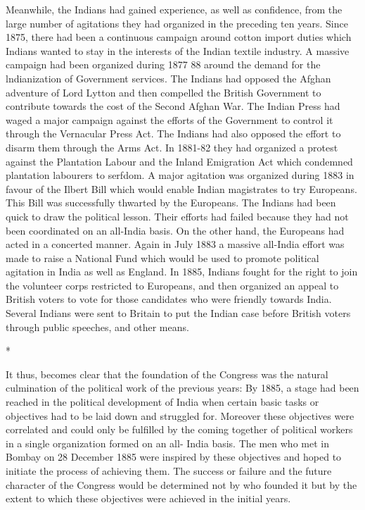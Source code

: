 Meanwhile, the Indians had gained experience, as well as confidence, from the large number of agitations they had organized in the preceding ten years. Since 1875, there had been a continuous campaign around cotton import duties which Indians wanted to stay in the interests of the Indian textile industry. A massive campaign had been organized during 1877­ 88 around the demand for the lndianization of Government services. The Indians had opposed the Afghan adventure of Lord Lytton and then compelled the British Government to contribute towards the cost of the Second Afghan War. The Indian Press had waged a major campaign against the efforts of the Government to control it through the Vernacular Press Act. The Indians had also opposed the effort to disarm them through the Arms Act. In 1881-82 they had organized a protest against the Plantation Labour and the Inland Emigration Act which condemned plantation labourers to serfdom. A major agitation was organized during 1883 in favour of the Ilbert Bill which would enable Indian magistrates to try Europeans. This Bill was successfully thwarted by the Europeans. The Indians had been quick to draw the political lesson. Their efforts had failed because they had not been coordinated on an all-India basis. On the other hand, the Europeans had acted in a concerted manner. Again in July 1883 a massive all-India effort was made to raise a National Fund which would be used to promote political agitation in India as well as England. In 1885, Indians fought for the right to join the volunteer corps restricted to Europeans, and then organized an appeal to British voters to vote for those candidates who were friendly towards India. Several Indians were sent to Britain to put the Indian case before British voters through public speeches, and other means.

\begin{center}*\end{center}



It thus, becomes clear that the foundation of the Congress was the natural culmination of the political work of the previous years: By 1885, a stage had been reached in the political development of India when certain basic tasks or objectives had to be laid down and struggled for. Moreover these objectives were correlated and could only be fulfilled by the coming together of political workers in a single organization formed on an all- India basis. The men who met in Bombay on 28 December 1885 were inspired by these objectives and hoped to initiate the process of achieving them. The success or failure and the future character of the Congress would be determined not by who founded it but by the extent to which these objectives were achieved in the initial years.

